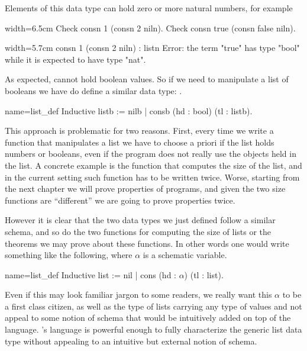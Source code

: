 Elements of this data type can hold zero or more natural numbers, for example

\begin{coq}{}{width=6.5cm}
Check consn 1 (consn 2 niln).
Check consn true (consn false niln).
$~$
$~$
\end{coq}{}{}
\begin{coqout}{}{width=5.7cm}
consn 1 (consn 2 niln) : listn
Error: the term "true" has
type "bool" while it is
expected to have type "nat".
\end{coqout}{}{}

As expected,  %
cannot hold boolean values.
So if we need to
manipulate a list of booleans we have do define a similar data type:
.

\begin{coq}{name=list_def}{}
Inductive listb := nilb | consb (hd : bool) (tl : listb).
\end{coq}

This approach is problematic for two reasons.  First, every time we
write a function that manipulates a list we have to choose a priori
if the list holds numbers or booleans, even if the program does not
really use the objects held in the list.
A concrete example is the function that computes the size of the list,
and in the current setting such function has to be written twice.
Worse, starting from the next chapter we will prove properties of programs,
and given the two size functions are ``different'' we are going to prove
properties twice.

However it is clear that the two data types we just defined follow
a similar schema, and so do the two functions for computing the size of lists
or the theorems we may prove about these functions.  In other words
one would write something
like the following, where $\alpha$ is a schematic variable.

\begin{coq}{name=list_def}{}
Inductive list := nil | cons (hd : $\alpha$) (tl : list).
\end{coq}

\noindent Even if this may look familiar jargon to some readers, we really want
this $\alpha$ to be a first class citizen, as well as the type of lists carrying
any type of values and not appeal to some notion of schema that would be
intuitively added on top of the \Coq{} language. %
%
\Coq{}'s language is powerful enough to fully characterize the generic
list data type without appealing to an intuitive but external notion of
schema.

